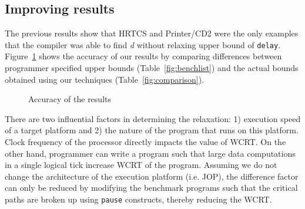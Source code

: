 \subsection{Improving results}

The previous results show that HRTCS and Printer/CD2 were the only
examples that the compiler was able to find \textit{d} without relaxing
upper bound of \texttt{delay}. Figure~\ref{fig:graph} shows the accuracy
of our results by comparing differences between programmer specified
upper bounds (Table~\ref{fig:benchlist}) and the actual bounds obtained
using our techniques (Table~\ref{fig:comparison}).

\begin{figure}[h!]
	\centering
{}
\caption{Accuracy of the results}
\label{fig:graph}
\end{figure}

There are two influential factors in determining the relaxation: 1)
execution speed of a target platform and 2) the nature of the program
that runs on this platform. Clock frequency of the processor directly
impacts the value of WCRT. On the other hand, programmer can write a
program such that large data computations in a single logical tick
increase WCRT of the program. Assuming we do not change the architecture
of the execution platform (i.e. JOP), the difference factor can only be
reduced by modifying the benchmark programs such that the critical paths
are broken up using \texttt{pause} constructs, thereby reducing the
WCRT.

